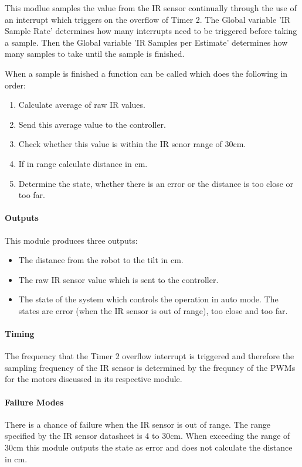 \documentclass{article}
\begin{document}
This modlue samples the value from the IR sensor continually through the use of an interrupt which triggers on the overflow of Timer 2. The Global variable 'IR Sample Rate' determines how many interrupts need to be triggered before taking a sample. Then the  Global variable 'IR Samples per Estimate' determines how many samples to take until the sample is finished.

When a sample is finished a function can be called which does the following in order:
\begin{enumerate}
	\item Calculate average of raw IR values. 
	\item Send this average value to the controller. 
	\item Check whether this value is within the IR senor range of 30cm.	
	\item If in range calculate distance in cm.
	\item Determine the state, whether there is an error or the distance is too close or too far.
\end{enumerate}
 
\paragraph{Outputs}
This module produces three outputs:
\begin{itemize}
		\item The distance from the robot to the tilt in cm.
		\item The raw IR sensor value which is sent to the controller.
		\item The state of the system which controls the operation in auto mode. The states are error (when the IR sensor is out of range), too close and too far.
\end{itemize}
  
\paragraph{Timing}
The frequency that the Timer 2 overflow interrupt is triggered and therefore the sampling frequency of the IR sensor is determined by the frequncy of the PWMs for the motors discussed in its respective module. 

\paragraph{Failure Modes}
There is a chance of failure when the IR sensor is out of range. The range specified by the IR sensor datasheet is 4 to 30cm. When exceeding the range of 30cm this module outputs the state as error and does not calculate the distance in cm. 
\end{document}
